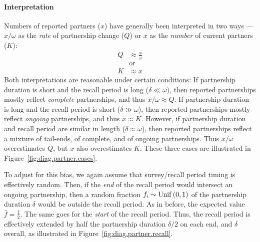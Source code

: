 \paragraph{Interpretation}
Numbers of reported partners ($x$) have generally been interpreted in two ways ---
$x/\omega$ as the \emph{rate} of partnership change ($Q$) or
$x$ as the \emph{number} of current partners ($K$):
\begin{subequations}\label{eq:bQK}
\begin{alignat}{1}
  Q &\approx \frac{x}{\omega} \label{eq:bQ}\\
    &\text{or} \nonumber\\
  K &\approx x \label{eq:bK}
\end{alignat}
\end{subequations}
Both interpretations are reasonable under certain conditions:
If partnership duration is short and the recall period is long ($\delta \ll \omega$),
then reported partnerships mostly reflect \emph{complete} partnerships,
and thus $x/\omega \approx Q$.
If partnership duration is long and the recall period is short ($\delta \gg \omega$),
then reported partnerships mostly reflect \emph{ongoing} partnerships,
and thus $x \approx K$.
However, if partnership duration and recall period are similar in length ($\delta \approx \omega$),
then reported partnerships reflect a mixture of tail-ends, of complete, and of ongoing partnerships.
Thus $x/\omega$ overestimates $Q$, but $x$ also overestimates $K$. %
These three cases are illustrated in Figure~\ref{fig:diag.partner.cases}. %
\par
To adjust for this bias, we again assume that survey/recall period timing is effectively random.
Then, if the \emph{end} of the recall period would intersect an ongoing partnership,
then a random fraction $f_i \sim \mathrm{Unif}\,(0,1)$ of the partnership duration $\delta$
would be outside the recall period. %
As in before, the expected value $\bar{f} = \frac12$.
The same goes for the \emph{start} of the recall period.
Thus, the recall period is effectively extended by
half the partnership duration $\delta/2$ on each end, and $\delta$ overall,
as illustrated in Figure~\ref{fig:diag.partner.recall}.
